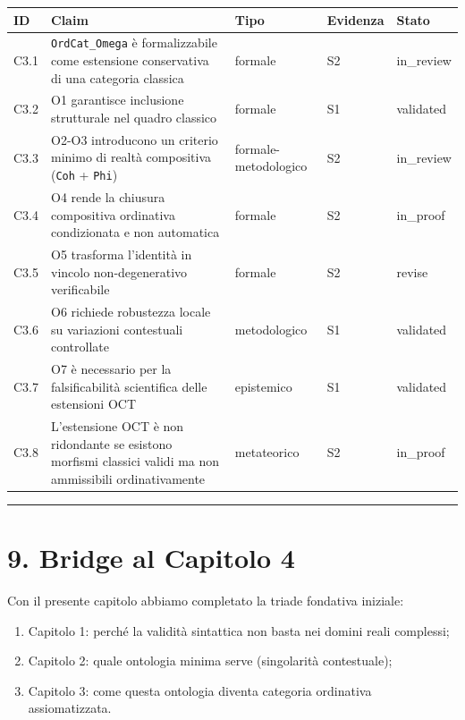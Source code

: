 {\def\LTcaptype{none} %
\begin{longtable}[]{@{}lllll@{}}
\toprule\noalign{}
ID & Claim & Tipo & Evidenza & Stato \\
\midrule\noalign{}
\endhead
\bottomrule\noalign{}
\endlastfoot
C3.1 & \texttt{OrdCat\_Omega} è formalizzabile come estensione conservativa di una categoria classica & formale & S2 & in\_review \\
C3.2 & O1 garantisce inclusione strutturale nel quadro classico & formale & S1 & validated \\
C3.3 & O2-O3 introducono un criterio minimo di realtà compositiva (\texttt{Coh} + \texttt{Phi}) & formale-metodologico & S2 & in\_review \\
C3.4 & O4 rende la chiusura compositiva ordinativa condizionata e non automatica & formale & S2 & in\_proof \\
C3.5 & O5 trasforma l'identità in vincolo non-degenerativo verificabile & formale & S2 & revise \\
C3.6 & O6 richiede robustezza locale su variazioni contestuali controllate & metodologico & S1 & validated \\
C3.7 & O7 è necessario per la falsificabilità scientifica delle estensioni OCT & epistemico & S1 & validated \\
C3.8 & L'estensione OCT è non ridondante se esistono morfismi classici validi ma non ammissibili ordinativamente & metateorico & S2 & in\_proof \\
\end{longtable}
}

\begin{center}\rule{0.5\linewidth}{0.5pt}\end{center}

\section{9. Bridge al Capitolo 4}

Con il presente capitolo abbiamo completato la triade fondativa iniziale:

\begin{enumerate}
\def\labelenumi{\arabic{enumi}.}
\tightlist
\item
  Capitolo 1: perché la validità sintattica non basta nei domini reali complessi;
\item
  Capitolo 2: quale ontologia minima serve (singolarità contestuale);
\item
  Capitolo 3: come questa ontologia diventa categoria ordinativa assiomatizzata.
\end{enumerate}

